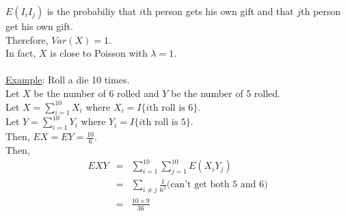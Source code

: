     $E(I_iI_j)$ is the probabiliy that $i$th person gets his own gift and
    that $j$th person get his own gift.\\
    Therefore, $Var(X) = 1$.\\
    In fact, $X$ is close to Poisson with $\lambda = 1$.\\\\
    \underline{Example}: Roll a die 10 times.\\
    Let $X$ be the number of 6 rolled and $Y$ be the number of 5 rolled.\\
    Let $X = \sum_{i = 1}^10 X_i$ where $X_i = I\{\text{$i$th roll is
    6}\}$.\\
    Let $Y = \sum_{i = 1}^10 Y_i$ where $Y_i = I\{\text{$i$th roll is
    5}\}$.\\
    Then, $EX = EY = \frac{10}{6}$.\\
    Then, 
    \begin{eqnarray*}
      EXY & = & \sum_{i = 1}^10 \sum_{j = 1}^{10} E(X_iY_j)\\
      & = & \sum_{i \not= j}\frac{1}{6^2} \text{(can't get both 5 and 6)}\\
      & = & \frac{10 \times 9}{36}
    \end{eqnarray*}

